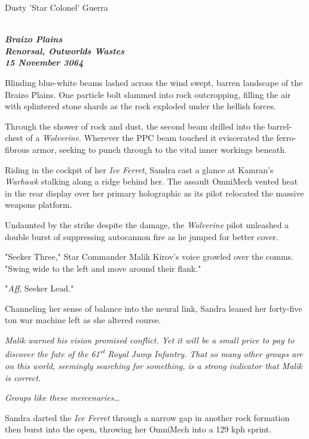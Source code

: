 \begin{center}
Dusty 'Star Colonel' Guerra
\end{center}


\emph{
\bfseries
\\Braizo Plains\\
\noindent
Renorsal, Outworlds Wastes\\
15 November 3064
}

Blinding blue-white beams lashed across the wind swept, barren landscape of the Braizo Plains.
One particle bolt slammed into rock outcropping, filling the air with splintered stone shards as the rock exploded under the hellish forces.

Through the shower of rock and dust, the second beam drilled into the barrel-chest of a \emph{Wolverine}.
Wherever the PPC beam touched it eviscerated the ferro-fibrous armor, seeking to punch through to the vital inner workings beneath.

Riding in the cockpit of her \emph{Ice Ferret}, Sandra cast a glance at Kamran's \emph{Warhawk} stalking along a ridge behind her.
The assault OmniMech vented heat in the rear display over her primary holographic as its pilot relocated the massive weapons platform.

Undaunted by the strike despite the damage, the \emph{Wolverine} pilot unleashed a double burst of suppressing autocannon fire as he jumped for better cover.

"Seeker Three," Star Commander Malik Kirov's voice growled over the comms. "Swing wide to the left and move around their flank."

"\emph{Aff}, Seeker Lead."

Channeling her sense of balance into the neural link, Sandra leaned her forty-five ton war machine left as she altered course.

\emph{
Malik warned his vision promised conflict.
Yet it will be a small price to pay to discover the fate of the 61\textsuperscript{st} Royal Jump Infantry.
That so many other groups are on this world, seemingly searching for something, is a strong indicator that Malik is correct.
}

\emph{
Groups like these mercenaries{\ldots}
}

Sandra darted the \emph{Ice Ferret} through a narrow gap in another rock formation then burst into the open, throwing her OmniMech into a 129 kph sprint. 

